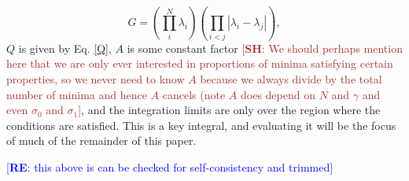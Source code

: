 \documentclass[12pt]{article}
\newcommand{\re}[1]{\textcolor{blue}{[{\bf RE}: #1]}}
\newcommand{\SH}[1]{\textcolor{brown}{[{\bf SH}: #1]}}
\begin{document}
\begin{equation}
G = \left(\prod_{i}^{N} \lambda_i \right)\left(\prod_{i<j} |\lambda_i-\lambda_j|\right),
\end{equation} 
%
$Q$ is given by Eq. \ref{Q}, $A$ is some constant factor \SH{We should perhaps mention here that we are only ever interested in proportions of minima satisfying certain properties, so we never need to know $A$ because we always divide by the total number of minima and hence $A$ cancels (note $A$ does depend on $N$ and $\gamma$ and even $\sigma_0$ and $\sigma_1$}, and the integration limits are only over the region where the conditions are satisfied. This is a key integral, and evaluating it will be the focus of much of the remainder of this paper.


\re{this above is can be checked for self-consistency and trimmed}

\end{document}
